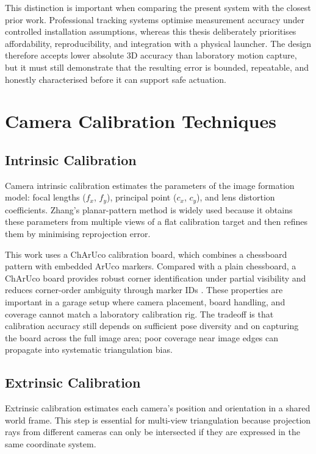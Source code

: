This distinction is important when comparing the present system with the closest prior work. Professional tracking systems optimise measurement accuracy under controlled installation assumptions, whereas this thesis deliberately prioritises affordability, reproducibility, and integration with a physical launcher. The design therefore accepts lower absolute 3D accuracy than laboratory motion capture, but it must still demonstrate that the resulting error is bounded, repeatable, and honestly characterised before it can support safe actuation.

\section{Camera Calibration Techniques}

\subsection{Intrinsic Calibration}

Camera intrinsic calibration estimates the parameters of the image formation model: focal lengths ($f_x$, $f_y$), principal point ($c_x$, $c_y$), and lens distortion coefficients. Zhang's planar-pattern method \cite{ref9} is widely used because it obtains these parameters from multiple views of a flat calibration target and then refines them by minimising reprojection error.

This work uses a ChArUco calibration board, which combines a chessboard pattern with embedded ArUco markers. Compared with a plain chessboard, a ChArUco board provides robust corner identification under partial visibility and reduces corner-order ambiguity through marker IDs \cite{ref10}. These properties are important in a garage setup where camera placement, board handling, and coverage cannot match a laboratory calibration rig. The tradeoff is that calibration accuracy still depends on sufficient pose diversity and on capturing the board across the full image area; poor coverage near image edges can propagate into systematic triangulation bias.

\subsection{Extrinsic Calibration}

Extrinsic calibration estimates each camera's position and orientation in a shared world frame. This step is essential for multi-view triangulation because projection rays from different cameras can only be intersected if they are expressed in the same coordinate system.

